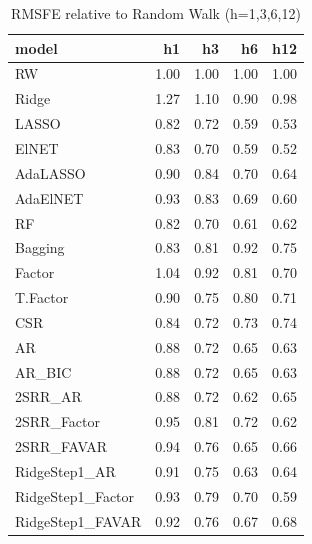 \begin{table}[ht]
\centering
\begin{tabular}{lrrrr}
  \hline
model & h1 & h3 & h6 & h12 \\ 
  \hline
RW & 1.00 & 1.00 & 1.00 & 1.00 \\ 
  Ridge & 1.27 & 1.10 & 0.90 & 0.98 \\ 
  LASSO & 0.82 & 0.72 & 0.59 & 0.53 \\ 
  ElNET & 0.83 & 0.70 & 0.59 & 0.52 \\ 
  AdaLASSO & 0.90 & 0.84 & 0.70 & 0.64 \\ 
  AdaElNET & 0.93 & 0.83 & 0.69 & 0.60 \\ 
  RF & 0.82 & 0.70 & 0.61 & 0.62 \\ 
  Bagging & 0.83 & 0.81 & 0.92 & 0.75 \\ 
  Factor & 1.04 & 0.92 & 0.81 & 0.70 \\ 
  T.Factor & 0.90 & 0.75 & 0.80 & 0.71 \\ 
  CSR & 0.84 & 0.72 & 0.73 & 0.74 \\ 
  AR & 0.88 & 0.72 & 0.65 & 0.63 \\ 
  AR\_BIC & 0.88 & 0.72 & 0.65 & 0.63 \\ 
  2SRR\_AR & 0.88 & 0.72 & 0.62 & 0.65 \\ 
  2SRR\_Factor & 0.95 & 0.81 & 0.72 & 0.62 \\ 
  2SRR\_FAVAR & 0.94 & 0.76 & 0.65 & 0.66 \\ 
  RidgeStep1\_AR & 0.91 & 0.75 & 0.63 & 0.64 \\ 
  RidgeStep1\_Factor & 0.93 & 0.79 & 0.70 & 0.59 \\ 
  RidgeStep1\_FAVAR & 0.92 & 0.76 & 0.67 & 0.68 \\ 
   \hline
\end{tabular}
\caption{RMSFE relative to Random Walk (h=1,3,6,12)} 
\label{tab:rmsfe_rw}
\end{table}
